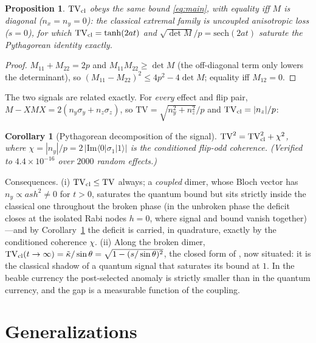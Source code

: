 \documentclass[11pt]{article}
\newtheorem{proposition}[theorem]{Proposition}
\newtheorem{corollary}[theorem]{Corollary}
\theoremstyle{remark}
\newcommand{\TV}{\mathrm{TV}}
\newcommand{\ket}[1]{|#1\rangle}
\newcommand{\bra}[1]{\langle #1|}
\begin{document}
\begin{proposition}
\label{prop:classical}
$\TV_{\rm cl}$ obeys the same bound \eqref{eq:main}, with equality
iff $M$ is diagonal ($n_x=n_y=0$): the classical extremal family is
\emph{uncoupled anisotropic loss} ($s=0$), for which
$\TV_{\rm cl}=\tanh(2at)$ and $\sqrt{\det M}/p=\mathrm{sech}(2at)$
saturate the Pythagorean identity exactly.
\end{proposition}

\begin{proof}
$M_{11}+M_{22}=2p$ and $M_{11}M_{22}\ge\det M$ (the off-diagonal
term only lowers the determinant), so
$(M_{11}-M_{22})^{2}\le4p^{2}-4\det M$; equality iff $M_{12}=0$.
\end{proof}

The two signals are related exactly. For \emph{every} effect and
flip pair, $M-XMX=2(n_y\sigma_y+n_z\sigma_z)$, so
$\TV=\sqrt{n_y^{2}+n_z^{2}}/p$ and $\TV_{\rm cl}=|n_z|/p$:

\begin{corollary}[Pythagorean decomposition of the signal]
\label{cor:pythagoras}
$\TV^{2}=\TV_{\rm cl}^{2}+\chi^{2}$, where
$\chi=|n_y|/p=2\,|\mathrm{Im}\bra{0}\sigma_1\ket{1}|$ is the
conditioned flip-odd coherence. (Verified to $4.4\times10^{-16}$
over $2000$ random effects.)
\end{corollary}

Consequences. (i) $\TV_{\rm cl}\le\TV$ always; a \emph{coupled}
dimer, whose Bloch vector has $n_y\propto as h^{2}\neq0$ for $t>0$,
saturates the quantum bound but sits strictly inside the classical
one throughout the broken phase (in the unbroken phase the deficit
closes at the isolated Rabi nodes $h=0$, where signal and bound
vanish together)---and by Corollary~\ref{cor:pythagoras} the
deficit is carried, in quadrature, exactly by the conditioned
coherence $\chi$. (ii) Along the broken dimer,
$\TV_{\rm cl}(t\to\infty)=\tilde\kappa/\sin\theta
=\sqrt{1-(s/\sin\theta)^{2}}$, the closed form of
\cite{instantaneous}, now situated: it is the classical shadow of a
quantum signal that saturates its bound at $1$. In the beable
currency the post-selected anomaly is strictly smaller than in the
quantum currency, and the gap is a measurable function of the
coupling.

\section{Generalizations}
\label{sec:general}
\end{document}
